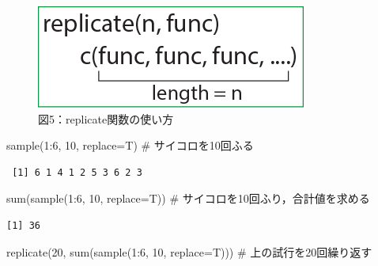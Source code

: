 \documentclass[
  letterpaper,
  DIV=11,
  numbers=noendperiod]{scrreprt}
\newenvironment{Shaded}{\begin{snugshade}}{\end{snugshade}}
\newcommand{\AttributeTok}[1]{\textcolor[rgb]{0.40,0.45,0.13}{#1}}
\newcommand{\CommentTok}[1]{\textcolor[rgb]{0.37,0.37,0.37}{#1}}
\newcommand{\DecValTok}[1]{\textcolor[rgb]{0.68,0.00,0.00}{#1}}
\newcommand{\FunctionTok}[1]{\textcolor[rgb]{0.28,0.35,0.67}{#1}}
\newcommand{\NormalTok}[1]{\textcolor[rgb]{0.00,0.23,0.31}{#1}}
\newcommand{\SpecialCharTok}[1]{\textcolor[rgb]{0.37,0.37,0.37}{#1}}
\begin{document}
\begin{figure}

{\centering \includegraphics{././image/chapter15_replicate.png}

}

\caption{図5：replicate関数の使い方}

\end{figure}

\begin{Shaded}
\begin{Highlighting}[]
\FunctionTok{sample}\NormalTok{(}\DecValTok{1}\SpecialCharTok{:}\DecValTok{6}\NormalTok{, }\DecValTok{10}\NormalTok{, }\AttributeTok{replace=}\NormalTok{T) }\CommentTok{\# サイコロを10回ふる}
\end{Highlighting}
\end{Shaded}

\begin{verbatim}
 [1] 6 1 4 1 2 5 3 6 2 3
\end{verbatim}

\begin{Shaded}
\begin{Highlighting}[]
\FunctionTok{sum}\NormalTok{(}\FunctionTok{sample}\NormalTok{(}\DecValTok{1}\SpecialCharTok{:}\DecValTok{6}\NormalTok{, }\DecValTok{10}\NormalTok{, }\AttributeTok{replace=}\NormalTok{T)) }\CommentTok{\# サイコロを10回ふり，合計値を求める}
\end{Highlighting}
\end{Shaded}

\begin{verbatim}
[1] 36
\end{verbatim}

\begin{Shaded}
\begin{Highlighting}[]
\FunctionTok{replicate}\NormalTok{(}\DecValTok{20}\NormalTok{, }\FunctionTok{sum}\NormalTok{(}\FunctionTok{sample}\NormalTok{(}\DecValTok{1}\SpecialCharTok{:}\DecValTok{6}\NormalTok{, }\DecValTok{10}\NormalTok{, }\AttributeTok{replace=}\NormalTok{T))) }\CommentTok{\# 上の試行を20回繰り返す}
\end{Highlighting}
\end{Shaded}
\end{document}
